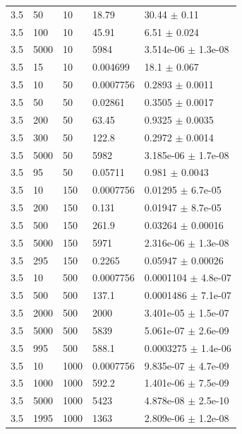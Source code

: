 \begin{longtable}{lllll}
	3.5 & 50 & 10 & 18.79 & 30.44 $\pm$ 0.11 \\
	3.5 & 100 & 10 & 45.91 & 6.51 $\pm$ 0.024 \\
	3.5 & 5000 & 10 & 5984 & 3.514e-06 $\pm$ 1.3e-08 \\
	3.5 & 15 & 10 & 0.004699 & 18.1 $\pm$ 0.067 \\
	3.5 & 10 & 50 & 0.0007756 & 0.2893 $\pm$ 0.0011 \\
	3.5 & 50 & 50 & 0.02861 & 0.3505 $\pm$ 0.0017 \\
	3.5 & 200 & 50 & 63.45 & 0.9325 $\pm$ 0.0035 \\
	3.5 & 300 & 50 & 122.8 & 0.2972 $\pm$ 0.0014 \\
	3.5 & 5000 & 50 & 5982 & 3.185e-06 $\pm$ 1.7e-08 \\
	3.5 & 95 & 50 & 0.05711 & 0.981 $\pm$ 0.0043 \\
	3.5 & 10 & 150 & 0.0007756 & 0.01295 $\pm$ 6.7e-05 \\
	3.5 & 200 & 150 & 0.131 & 0.01947 $\pm$ 8.7e-05 \\
	3.5 & 500 & 150 & 261.9 & 0.03264 $\pm$ 0.00016 \\
	3.5 & 5000 & 150 & 5971 & 2.316e-06 $\pm$ 1.3e-08 \\
	3.5 & 295 & 150 & 0.2265 & 0.05947 $\pm$ 0.00026 \\
	3.5 & 10 & 500 & 0.0007756 & 0.0001104 $\pm$ 4.8e-07 \\
	3.5 & 500 & 500 & 137.1 & 0.0001486 $\pm$ 7.1e-07 \\
	3.5 & 2000 & 500 & 2000 & 3.401e-05 $\pm$ 1.5e-07 \\
	3.5 & 5000 & 500 & 5839 & 5.061e-07 $\pm$ 2.6e-09 \\
	3.5 & 995 & 500 & 588.1 & 0.0003275 $\pm$ 1.4e-06 \\
	3.5 & 10 & 1000 & 0.0007756 & 9.835e-07 $\pm$ 4.7e-09 \\
	3.5 & 1000 & 1000 & 592.2 & 1.401e-06 $\pm$ 7.5e-09 \\
	3.5 & 5000 & 1000 & 5423 & 4.878e-08 $\pm$ 2.5e-10 \\
	3.5 & 1995 & 1000 & 1363 & 2.809e-06 $\pm$ 1.2e-08 \\
\end{longtable}




